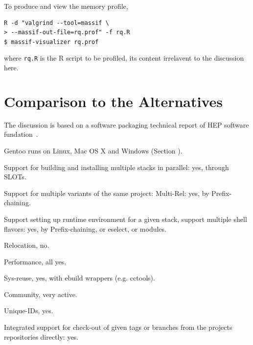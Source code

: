 \documentclass[a4paper,conference]{IEEEtran}
\begin{document}
To produce and view the memory profile,
\begin{verbatim}
R -d "valgrind --tool=massif \
> --massif-out-file=rq.prof" -f rq.R
$ massif-visualizer rq.prof
\end{verbatim}
where \texttt{rq.R} is the R script to be profiled, its content
irrelavent to the discussion here.

\section{Comparison to the Alternatives}
The discussion is based on a software packaging technical report of
HEP software fundation~\cite{hsf:package}.

Gentoo runs on Linux, Mac OS X and Windows
(Section \label{sec:portage}).

Support for building and installing multiple stacks in parallel:
yes, through SLOTs.

Support for multiple variants of the same project: Multi-Rel: yes,
by Prefix-chaining.

Support setting up runtime environment for a given stack, support
multiple shell flavors: yes, by Prefix-chaining, or eselect, or
modules.

Relocation, no.

Performance, all yes.

Sys-reuse, yes, with ebuild wrappers (e.g. cctools).

Community, very active.

Unique-IDs, yes.

Integrated support for check-out of given tags or branches from the
projects repositories directly: yes.



\end{document}
